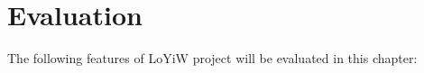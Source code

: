 \newpage
\chapter{Evaluation}


The following features of LoYiW project will be evaluated in this chapter:

